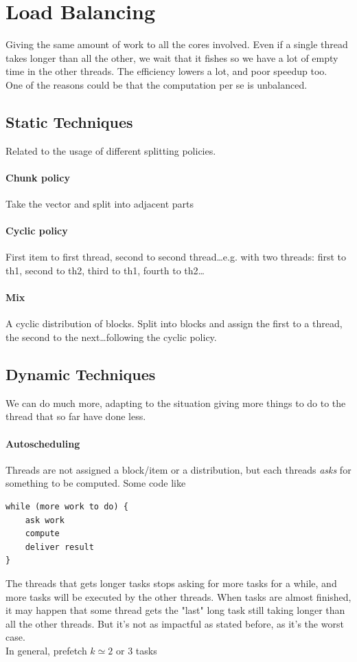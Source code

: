 \documentclass[10pt]{report}
\begin{document}
\section{Load Balancing} Giving the same amount of work to all the cores involved. Even if a single thread takes longer than all the other, we wait that it fishes so we have a lot of empty time in the other threads. The efficiency lowers a lot, and poor speedup too.\\
One of the reasons could be that the computation per se is unbalanced.
\subsection{Static Techniques}
Related to the usage of different splitting policies.
\paragraph{Chunk policy} Take the vector and split into adjacent parts
\paragraph{Cyclic policy} First item to first thread, second to second thread\ldots e.g. with two threads: first to th1, second to th2, third to th1, fourth to th2\ldots
\paragraph{Mix} A cyclic distribution of blocks. Split into blocks and assign the first to a thread, the second to the next\ldots following the cyclic policy.
\subsection{Dynamic Techniques}
We can do much more, adapting to the situation giving more things to do to the thread that so far have done less.
\paragraph{Autoscheduling} Threads are not assigned a block/item or a distribution, but each threads \textit{asks} for something to be computed. Some code like \begin{lstlisting}
while (more work to do) {
	ask work
	compute
	deliver result
}
\end{lstlisting}
The threads that gets longer tasks stops asking for more tasks for a while, and more tasks will be executed by the other threads. When tasks are almost finished, it may happen that some thread gets the "last" long task still taking longer than all the other threads. But it's not as impactful as stated before, as it's the worst case.\\
In general, prefetch $k \simeq 2$ or $3$ tasks
\end{document}
